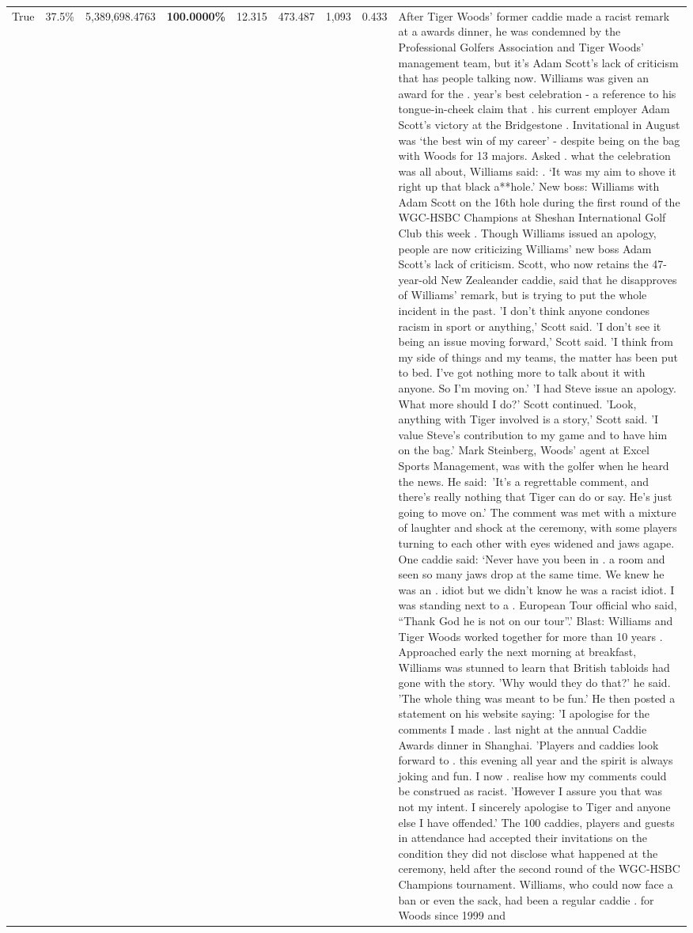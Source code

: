 \begin{table}[H]
\begin{tabular}{lllrlllll}
True & 37.5\% & 5,389,698.4763 & \bfseries \color{red} 100.0000\% & 12.315 & 473.487 & 1,093 & 0.433 & After Tiger Woods' former caddie made a racist remark at a awards dinner, he was condemned by the Professional Golfers Association and Tiger Woods' management team, but it's Adam Scott's lack of criticism that has people talking now. Williams was given an award for the . year’s best celebration - a reference to his tongue-in-cheek claim that . his current employer Adam Scott’s victory at the Bridgestone . Invitational in August was ‘the best win of my career’ - despite being on the bag with Woods for 13 majors. Asked . what the celebration was all about, Williams said: . ‘It was my aim to shove it right up that black a**hole.’ New boss: Williams with Adam Scott  on the 16th hole during the first round of the WGC-HSBC Champions at Sheshan International Golf Club this week . Though Williams issued an apology, people are now criticizing Williams' new boss Adam Scott's lack of criticism. Scott, who now retains the 47-year-old New Zealeander caddie, said that he disapproves of Williams' remark, but is trying to put the whole incident in the past. 'I don't think anyone condones racism in sport or anything,' Scott said. 'I don't see it being an issue moving forward,' Scott said. 'I think from my side of things and my teams, the matter has been put to bed. I've got nothing more to talk about it with anyone. So I'm moving on.' 'I had Steve issue an apology. What more should I do?' Scott continued. 'Look, anything with Tiger involved is a story,' Scott said. 'I value Steve's contribution to my game and to have him on the bag.' Mark Steinberg, Woods' agent at Excel Sports Management, was with the golfer when he heard the news. He said: 'It's a regrettable comment, and there's really nothing that Tiger can do or say. He's just going to move on.' The comment was met with a mixture of laughter and shock at the ceremony, with some players turning to each other with eyes widened and jaws agape. One caddie said: ‘Never have you been in . a room and seen so many jaws drop at the same time. We knew he was an . idiot but we didn’t know he was a racist idiot. I was standing next to a . European Tour official who said, “Thank God he is not on our tour”.’ Blast: Williams and Tiger Woods worked together for more than 10 years . Approached early the next morning at breakfast, Williams was stunned to learn that British tabloids had gone with the story. 'Why would they do that?' he said. 'The whole thing was meant to be fun.' He then posted a statement on his website saying: 'I apologise for the comments I made . last night at the annual Caddie Awards dinner in Shanghai. 'Players and caddies look forward to . this evening all year and the spirit is always joking and fun. I now . realise how my comments could be construed as racist. 'However I assure you that was not my intent. I sincerely apologise to Tiger and anyone else I have offended.' The 100 caddies, players and guests in attendance had accepted their invitations on the condition they did not disclose what happened at the ceremony, held after the second round of the WGC-HSBC Champions tournament. Williams, who could now face a ban or even the sack, had been a regular caddie . for Woods since 1999 and 
\end{tabular}
\end{table}
